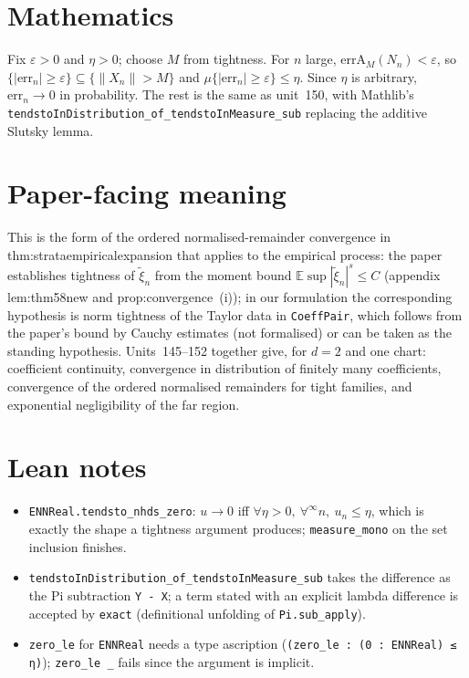 \documentclass[11pt]{article}
\begin{document}
\section{Mathematics}
Fix $\varepsilon>0$ and $\eta>0$; choose $M$ from tightness. For $n$ large,
$\mathrm{errA}_M(N_n)<\varepsilon$, so $\{|\mathrm{err}_n|\ge\varepsilon\}\subseteq\{\|X_n\|>M\}$
and $\mu\{|\mathrm{err}_n|\ge\varepsilon\}\le\eta$. Since $\eta$ is arbitrary, $\mathrm{err}_n\to0$
in probability. The rest is the same as unit~150, with Mathlib's
\texttt{tendstoInDistribution\_of\_tendstoInMeasure\_sub} replacing the additive Slutsky lemma.

\section{Paper-facing meaning}
This is the form of the ordered normalised-remainder convergence in thm:strataempiricalexpansion
that applies to the empirical process: the paper establishes tightness of $\tilde\xi_n$ from the
moment bound $\mathbb E\sup|\tilde\xi_n|^s\le C$ (appendix lem:thm58new and prop:convergence~(i));
in our formulation the corresponding hypothesis is norm tightness of the Taylor data in
\texttt{CoeffPair}, which follows from the paper's bound by Cauchy estimates (not formalised) or
can be taken as the standing hypothesis. Units~145--152 together give, for $d=2$ and one chart:
coefficient continuity, convergence in distribution of finitely many coefficients, convergence of
the ordered normalised remainders for tight families, and exponential negligibility of the far
region.

\section{Lean notes}
\begin{itemize}
\item \texttt{ENNReal.tendsto\_nhds\_zero}: $u\to0$ iff $\forall\eta>0,\ \forall^\infty n,\ u_n\le\eta$,
which is exactly the shape a tightness argument produces; \texttt{measure\_mono} on the set
inclusion finishes.
\item \texttt{tendstoInDistribution\_of\_tendstoInMeasure\_sub} takes the difference as the Pi
subtraction \texttt{Y - X}; a term stated with an explicit lambda difference is accepted by
\texttt{exact} (definitional unfolding of \texttt{Pi.sub\_apply}).
\item \texttt{zero\_le} for \texttt{ENNReal} needs a type ascription
(\texttt{(zero\_le : (0 : ENNReal) ≤ η)}); \texttt{zero\_le \_} fails since the argument is implicit.
\end{itemize}
\end{document}
